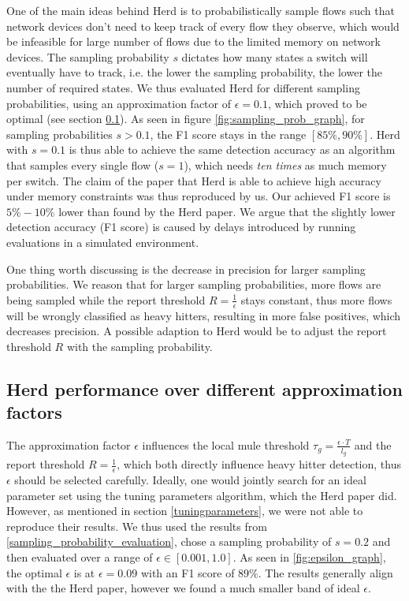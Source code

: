 \documentclass[11pt,oneside,a4paper]{article}
\begin{document}
One of the main ideas behind Herd is to probabilistically sample flows such that network devices don't need to keep track of every flow they observe, which would be infeasible for large number of flows due to the limited memory on network devices. The sampling probability $s$ dictates how many states a switch will eventually have to track, i.e. the lower the sampling probability, the lower the number of required states. We thus evaluated Herd for different sampling probabilities, using an approximation factor of $\epsilon = 0.1$, which proved to be optimal (see section \ref{epsilon_evaluation}). As seen in figure \ref{fig:sampling_prob_graph}, for sampling probabilities $s > 0.1$, the F1 score stays in the range $[85\%, 90\%]$. Herd with $s = 0.1$ is thus able to achieve the same detection accuracy as an algorithm that samples every single flow ($s = 1$), which needs \textit{ten times} as much memory per switch. The claim of the paper that Herd is able to achieve high accuracy under memory constraints was thus reproduced by us. Our achieved F1 score is $5\% - 10\%$ lower than found by the Herd paper. We argue that the slightly lower detection accuracy (F1 score) is caused by delays introduced by running evaluations in a simulated environment.

One thing worth discussing is the decrease in precision for larger sampling probabilities. We reason that for larger sampling probabilities, more flows are being sampled while the report threshold $R = \frac{1}{\epsilon}$ stays constant, thus more flows will be wrongly classified as heavy hitters, resulting in more false positives, which decreases precision. A possible adaption to Herd would be to adjust the report threshold $R$ with the sampling probability.


\subsection{Herd performance over different approximation factors} \label{epsilon_evaluation}

The approximation factor $\epsilon$ influences the local mule threshold $\tau_g = \frac{\epsilon \cdot T}{l_g}$ and the report threshold $R = \frac{1}{\epsilon}$, which both directly influence heavy hitter detection, thus $\epsilon$ should be selected carefully. Ideally, one would jointly search for an ideal parameter set using the tuning parameters algorithm, which the Herd paper did. However, as mentioned in section \ref{tuningparameters}, we were not able to reproduce their results. We thus used the results from \ref{sampling_probability_evaluation}, chose a sampling probability of $s = 0.2$ and then evaluated over a range of $\epsilon \in [0.001, 1.0]$. As seen in \ref{fig:epsilon_graph}, the optimal $\epsilon$ is at $\epsilon = 0.09$ with an F1 score of $89\%$. The results generally align with the the Herd paper, however we found a much smaller band of ideal $\epsilon$.
\end{document}
